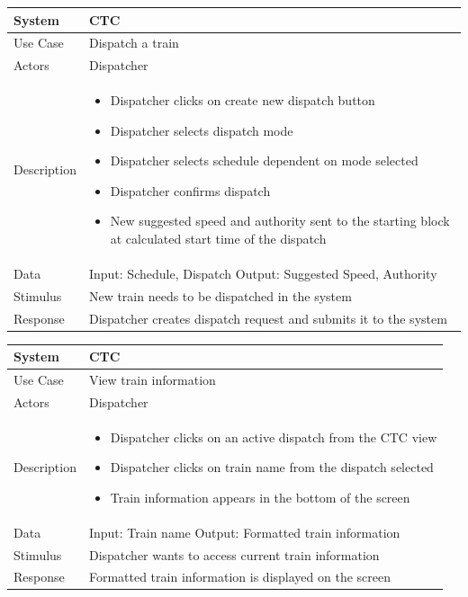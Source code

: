 \documentclass{article}
\begin{document}
    \begin{longtable}{
    || >{\raggedright\arraybackslash}m{}
    | >{\raggedright\arraybackslash}m{}||}
    \hline
    \textbf{System} & \textbf{CTC} \\
    \hline
    Use Case & Dispatch a train\\
    \hline
    Actors & Dispatcher\\
    \hline
    Description & \begin{itemize}
        \item Dispatcher clicks on create new dispatch button
        \item Dispatcher selects dispatch mode
        \item Dispatcher selects schedule dependent on mode selected
        \item Dispatcher confirms dispatch
        \item New suggested speed and authority sent to the starting block at calculated start time of the dispatch

    \end{itemize}\\
    \hline
    Data & Input: Schedule, Dispatch \newline Output: Suggested Speed, Authority\\
    \hline
    Stimulus & New train needs to be dispatched in the system\\
    \hline
    Response & Dispatcher creates dispatch request and submits it to the system\\
    \hline
    \end{longtable}
    \begin{longtable}{
    || >{\raggedright\arraybackslash}m{}
    | >{\raggedright\arraybackslash}m{}||}
    \hline
    \textbf{System} & \textbf{CTC} \\
    \hline
    Use Case & View train information\\
    \hline
    Actors & Dispatcher\\
    \hline
    Description & \begin{itemize}
        \item Dispatcher clicks on an active dispatch from the CTC view
        \item Dispatcher clicks on train name from the dispatch selected
        \item Train information appears in the bottom of the screen
    \end{itemize}\\
    \hline
    Data & Input: Train name \newline Output: Formatted train information\\
    \hline
    Stimulus & Dispatcher wants to access current train information\\
    \hline
    Response & Formatted train information is displayed on the screen\\
    \hline
    \end{longtable}
\end{document}
